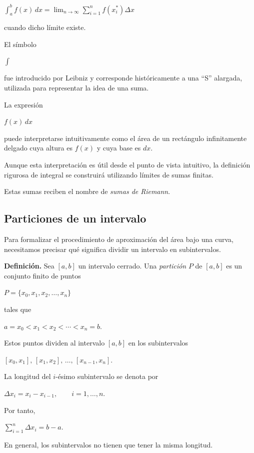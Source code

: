 \documentclass[12pt]{article}
\begin{document}
$
\boxed{
\int_a^b f(x)\,dx
=
\lim_{n\to\infty}
\sum_{i=1}^{n}
f(x_i^*)\Delta x
}
$

cuando dicho límite existe.

El símbolo

$
\int
$

fue introducido por Leibniz y corresponde históricamente a una
``S'' alargada, utilizada para representar la idea de una suma.

La expresión

$
f(x)\,dx
$

puede interpretarse intuitivamente como el área de un rectángulo
infinitamente delgado cuya altura es $f(x)$ y cuya base es $dx$.

Aunque esta interpretación es útil desde el punto de vista intuitivo,
la definición rigurosa de integral se construirá utilizando límites
de sumas finitas.

Estas sumas reciben el nombre de \emph{sumas de Riemann}.

\subsection*{Particiones de un intervalo}

Para formalizar el procedimiento de aproximación del área bajo una curva,
necesitamos precisar qué significa dividir un intervalo en subintervalos.

\textbf{Definición.}
Sea $[a,b]$ un intervalo cerrado. Una \emph{partición} $P$ de $[a,b]$
es un conjunto finito de puntos

$
P=\{x_0,x_1,x_2,\ldots,x_n\}
$

tales que

$
a=x_0<x_1<x_2<\cdots<x_n=b.
$

Estos puntos dividen al intervalo $[a,b]$ en los subintervalos

$
[x_0,x_1],\,
[x_1,x_2],\,
\ldots,\,
[x_{n-1},x_n].
$

La longitud del $i$-ésimo subintervalo se denota por

$
\Delta x_i=x_i-x_{i-1},
\qquad i=1,\ldots,n.
$

Por tanto,

$
\sum_{i=1}^{n}\Delta x_i=b-a.
$

En general, los subintervalos no tienen que tener la misma longitud.

\end{document}
